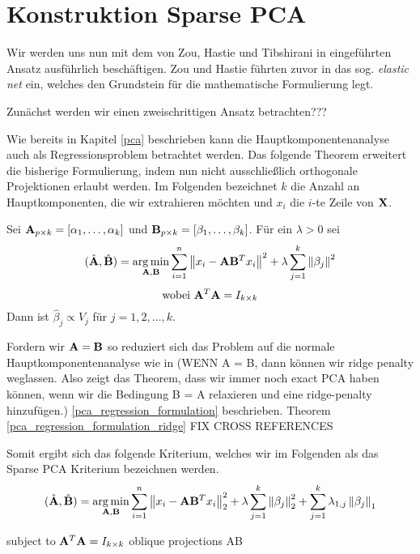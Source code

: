 \section{Konstruktion Sparse PCA}
\label{construction}

Wir werden uns nun mit dem von Zou, Hastie und Tibshirani in \cite{zou_sparsepca} eingeführten Ansatz ausführlich beschäftigen. Zou und Hastie führten zuvor in \cite{zou_elasticnet} das sog. \textit{elastic net} ein, welches den Grundstein für die mathematische Formulierung legt.

Zunächst werden wir einen zweischrittigen Ansatz betrachten???

Wie bereits in Kapitel \ref{pca} beschrieben kann die Hauptkomponentenanalyse auch als Regressionsproblem betrachtet werden. Das folgende Theorem erweitert die bisherige Formulierung, indem nun nicht ausschließlich orthogonale Projektionen erlaubt werden. 
Im Folgenden bezeichnet $k$ die Anzahl an Hauptkomponenten, die wir extrahieren möchten und $x_i$ die $i$-te Zeile von $\mathbf{X}$.

\begin{thm} \label{pca_regression_formulation_ridge}
Sei $\mathbf{A}_{p \times k} = [ \alpha_1, \ldots ,\alpha_k ]$ und $\mathbf{B}_{p \times k} = [ \beta_1, \ldots ,\beta_k ]$. Für ein $\lambda > 0$ sei
$$(\hat{\mathbf{A}}, \hat{\mathbf{B}}) = \operatorname*{arg\,min}_{\mathbf{A}, \mathbf{B}} \sum_{i=1}^{n} \left\lVert x_i - \mathbf{A}\mathbf{B}^Tx_i \right\rVert^2 + \lambda \sum_{j=1}^{k}\left\lVert \beta_j \right\rVert^2$$
$$\text{wobei } \mathbf{A}^T\mathbf{A} = I_{k \times k}$$
Dann ist $\hat{\beta}_j \propto V_j$ für $j = 1,2,\ldots,k$. 
\end{thm}

Fordern wir $\mathbf{A} =  \mathbf{B}$ so reduziert sich das Problem auf die normale Hauptkomponentenanalyse wie in (WENN A = B, dann können wir ridge penalty weglassen. Also zeigt das Theorem, dass wir immer noch exact PCA haben können, wenn wir die Bedingung B = A relaxieren und eine ridge-penalty hinzufügen.) \ref{pca_regression_formulation} beschrieben.
Theorem \ref{pca_regression_formulation_ridge} FIX CROSS REFERENCES

Somit ergibt sich das folgende Kriterium, welches wir im Folgenden als das Sparse PCA Kriterium bezeichnen werden.
$$(\hat{\mathbf{A}}, \hat{\mathbf{B}}) = \operatorname*{arg\,min}_{\mathbf{A}, \mathbf{B}} \sum_{i=1}^{n} \left\lVert x_i - \mathbf{A}\mathbf{B}^Tx_i \right\rVert_2^2 + \lambda \sum_{j=1}^{k}\left\lVert \beta_j \right\rVert_2^2 + \sum_{j=1}^k \lambda_{1,j} \left\lVert \beta_j \right\rVert_1$$

subject to $\mathbf{A}^T\mathbf{A} = I_{k \times k}$
oblique projections AB

